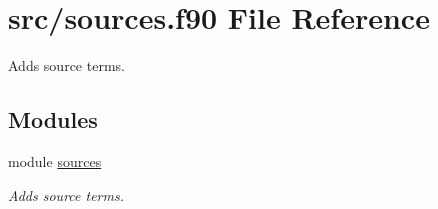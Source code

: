\hypertarget{sources_8f90}{}\section{src/sources.f90 File Reference}
\label{sources_8f90}


Adds source terms.  


\subsection*{Modules}
\begin{DoxyCompactItemize}
\item 
module \hyperlink{namespacesources}{sources}
\begin{DoxyCompactList}\small\item\em Adds source terms. \end{DoxyCompactList}\end{DoxyCompactItemize}

